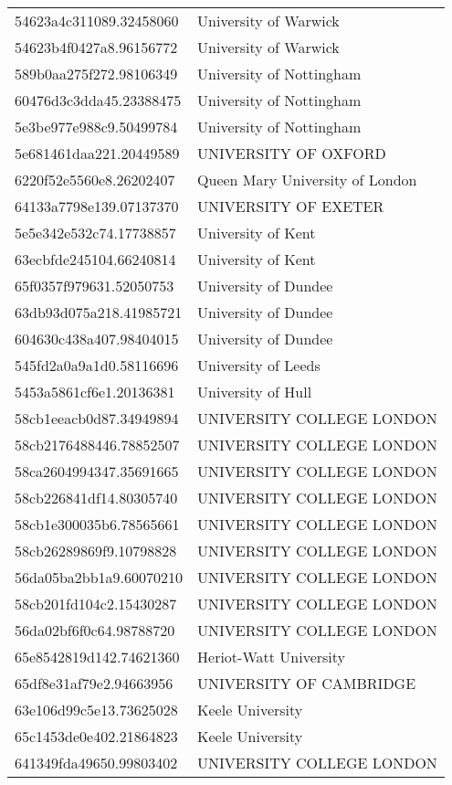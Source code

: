 \begin{tabular}{ll}
54623a4c311089.32458060 & University of Warwick \\
54623b4f0427a8.96156772 & University of Warwick \\
589b0aa275f272.98106349 & University of Nottingham \\
60476d3c3dda45.23388475 & University of Nottingham \\
5e3be977e988c9.50499784 & University of Nottingham \\
5e681461daa221.20449589 & UNIVERSITY OF OXFORD \\
6220f52e5560e8.26202407 & Queen Mary University of London \\
64133a7798e139.07137370 & UNIVERSITY OF EXETER \\
5e5e342e532c74.17738857 & University of Kent \\
63ecbfde245104.66240814 & University of Kent \\
65f0357f979631.52050753 & University of Dundee \\
63db93d075a218.41985721 & University of Dundee \\
604630c438a407.98404015 & University of Dundee \\
545fd2a0a9a1d0.58116696 & University of Leeds \\
5453a5861cf6e1.20136381 & University of Hull \\
58cb1eeacb0d87.34949894 & UNIVERSITY COLLEGE LONDON \\
58cb2176488446.78852507 & UNIVERSITY COLLEGE LONDON \\
58ca2604994347.35691665 & UNIVERSITY COLLEGE LONDON \\
58cb226841df14.80305740 & UNIVERSITY COLLEGE LONDON \\
58cb1e300035b6.78565661 & UNIVERSITY COLLEGE LONDON \\
58cb26289869f9.10798828 & UNIVERSITY COLLEGE LONDON \\
56da05ba2bb1a9.60070210 & UNIVERSITY COLLEGE LONDON \\
58cb201fd104c2.15430287 & UNIVERSITY COLLEGE LONDON \\
56da02bf6f0c64.98788720 & UNIVERSITY COLLEGE LONDON \\
65e8542819d142.74621360 & Heriot-Watt University \\
65df8e31af79e2.94663956 & UNIVERSITY OF CAMBRIDGE \\
63e106d99c5e13.73625028 & Keele University \\
65c1453de0e402.21864823 & Keele University \\
641349fda49650.99803402 & UNIVERSITY COLLEGE LONDON \\

\end{tabular}
